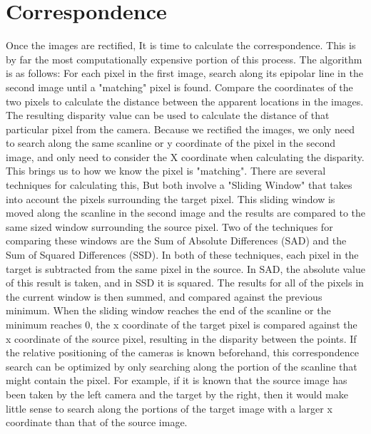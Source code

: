 \section{Correspondence}
Once the images are rectified, It is time to calculate the correspondence.  This is by far the most computationally expensive portion of this process.  The algorithm is as follows:  For each pixel in the first image, search along its epipolar line in the second image until a "matching" pixel is found.  Compare the coordinates of the two pixels to calculate the distance between the apparent locations in the images. The resulting disparity value can be used to calculate the distance of that particular pixel from the camera.  Because we rectified the images, we only need to search along the same scanline or y coordinate of the pixel in the second image, and only need to consider the X coordinate when calculating the disparity.  This brings us to how we know the pixel is "matching".  There are several techniques for calculating this, But both involve a "Sliding Window" that takes into account the pixels surrounding the target pixel.  This sliding window is moved along the scanline in the second image and the results are compared to the same sized window surrounding the source pixel.  Two of the techniques for comparing these windows are the Sum of Absolute Differences (SAD) and the Sum of Squared Differences (SSD).  In both of these techniques, each pixel in the target is subtracted from the same pixel in the source.  In SAD, the absolute value of this result is taken, and in SSD it is squared.  The results for all of the pixels in the current window is then summed, and compared against the previous minimum.  When the sliding window reaches the end of the scanline or the minimum reaches 0, the x coordinate of the target pixel is compared against the x coordinate of the source pixel, resulting in the disparity between the points.  If the relative positioning of the cameras is known beforehand, this correspondence search can be optimized by only searching along the portion of the scanline that might contain the pixel.  For example, if it is known that the source image has been taken by the left camera and the target by the right, then it would make little sense to search along the portions of the target image with a larger x coordinate than that of the source image.